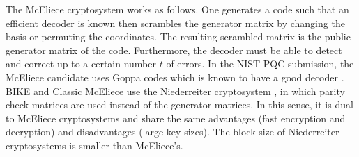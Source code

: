 The McEliece cryptosystem works as follows. One generates a code such that an efficient decoder is known then scrambles the generator matrix by changing the basis or permuting the coordinates. The resulting scrambled matrix is the public generator matrix of the code. Furthermore, the decoder must be able to detect and correct up to a certain number $t$ of errors. In the NIST PQC submission, the McEliece candidate uses Goppa codes which is known to have a good decoder \cite{mceliece,nistmceliece,mceliecedecoder}. BIKE and Classic McEliece use the Niederreiter cryptosystem \cite{niederreiter}, in which parity check matrices are used instead of the generator matrices. In this sense, it is dual to McEliece cryptosystems and share the same advantages (fast encryption and decryption) and disadvantages (large key sizes). The block size of Niederreiter cryptosystems is smaller than McEliece's.